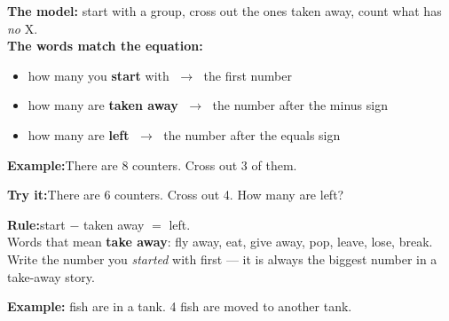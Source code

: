 \documentclass[12pt]{article}
\begin{document}


\begin{formulabox}
\textbf{The model:} start with a group, cross out the ones taken away, count what has \emph{no} X.\\[3pt]
\textbf{The words match the equation:}
\begin{itemize}[leftmargin=0.8cm, itemsep=0pt, topsep=1pt]
  \item how many you \textbf{start} with $\;\rightarrow\;$ the first number
  \item how many are \textbf{taken away} $\;\rightarrow\;$ the number after the minus sign
  \item how many are \textbf{left} $\;\rightarrow\;$ the number after the equals sign
\end{itemize}
\end{formulabox}

\begin{examplebox}
\textbf{Example:}\quad There are 8 counters. Cross out 3 of them.
\end{examplebox}

\begin{tryitbox}
\textbf{Try it:}\quad There are 6 counters. Cross out 4. How many are left?\\[2pt]
\end{tryitbox}


\begin{formulabox}
\textbf{Rule:}\quad start $-$ taken away $=$ left.\\[3pt]
Words that mean \textbf{take away}: fly away, eat, give away, pop, leave, lose, break.
Write the number you \emph{started} with first --- it is always the biggest number in a take-away story.
\end{formulabox}

\begin{examplebox}
\textbf{Example:} fish are in a tank. 4 fish are moved to another tank.
\end{examplebox}
\end{document}
